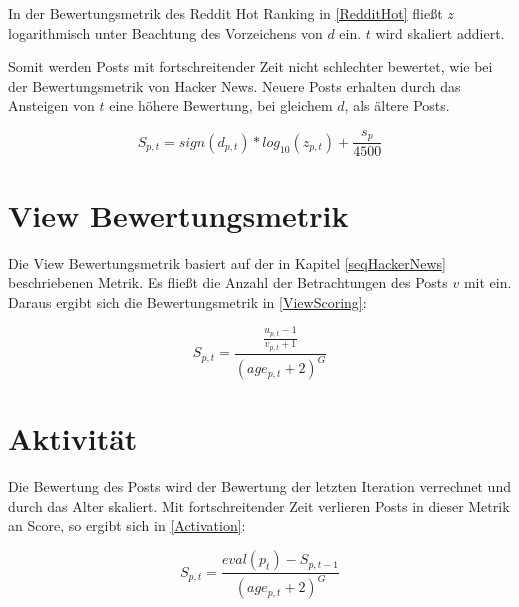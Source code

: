 In der Bewertungsmetrik des Reddit Hot Ranking in \ref{RedditHot} fließt $z$ logarithmisch unter Beachtung des Vorzeichens von $d$ ein. $t$ wird skaliert addiert.

Somit werden Posts mit fortschreitender Zeit nicht schlechter bewertet, wie bei der Bewertungsmetrik von Hacker News. Neuere Posts erhalten durch das Ansteigen von $t$ eine höhere Bewertung, bei gleichem $d$, als ältere Posts.  


\begin{equation}
\label{RedditHot}
S_{p,t} = sign(d_{p,t}) * log_{10}(z_{p,t}) + \frac{s_{p}}{4500}
\end{equation}



\section{View Bewertungsmetrik}

Die View Bewertungsmetrik basiert auf der in Kapitel \ref{seqHackerNews} beschriebenen Metrik. Es fließt die Anzahl der Betrachtungen des Posts $v$ mit ein. Daraus ergibt sich die Bewertungsmetrik in \ref{ViewScoring}:

\begin{equation}
\label{ViewScoring}
S_{p,t} = \frac{\frac{u_{p,t} - 1}{v_{p,t} + 1}}{(age_{p,t} + 2)^{G}}
\end{equation}


\section{Aktivität}

Die Bewertung des Posts wird der Bewertung der letzten Iteration verrechnet und durch das Alter skaliert. Mit fortschreitender Zeit verlieren Posts in dieser Metrik an Score, so ergibt sich in \ref{Activation}:


\begin{equation}
\label{Activation}
S_{p,t} = \frac{eval(p_{t}) - S_{p,t-1}}{(age_{p,t} + 2)^{G}}
\end{equation}

	